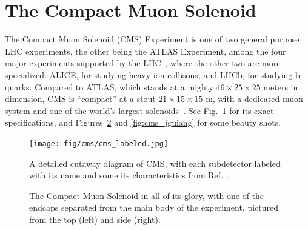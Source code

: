 \section{The Compact Muon Solenoid}\label{sec:cms}
The Compact Muon Solenoid (CMS) Experiment is one of two general purpose LHC experiments, the other being the ATLAS\footnotemark{} Experiment, among the four major experiments supported by the LHC~\cite{LHCWeb}, where the other two are more specialized: ALICE, for studying heavy ion collisons, and LHCb, for studying b quarks. 
Compared to ATLAS, which stands at a mighty $46\times25\times25$ meters in dimension, CMS is ``compact'' at a stout $21\times15\times15$ m, with a dedicated muon system and one of the world's largest solenoids~\cite{ATLASWeb, CMSWeb}. 
See Fig.~\ref{fig:cms_labeled} for its exact specifications, and Figures~\ref{fig:cms_pics} and \ref{fig:cms_jguiang} for some beauty shots. 

\begin{figure}[htb]
    \centering
    \texttt{[image: fig/cms/cms\_labeled.jpg]}
    \caption{
        A detailed cutaway diagram of CMS, with each subdetector labeled with its name and some its characteristics from Ref.~\cite{Sakuma:2665537}. 
    }
    \label{fig:cms_labeled}
\end{figure}

\begin{figure}[htb]
    \centering
    \quad
    \caption[The Compact Muon Solenoid in all of its glory, with one of the endcaps separated from the main body of the experiment, pictured from the top and side]{
        The Compact Muon Solenoid in all of its glory, with one of the endcaps separated from the main body of the experiment, pictured from the top (left) and side (right). %
    }
    \label{fig:cms_pics}
\end{figure}


